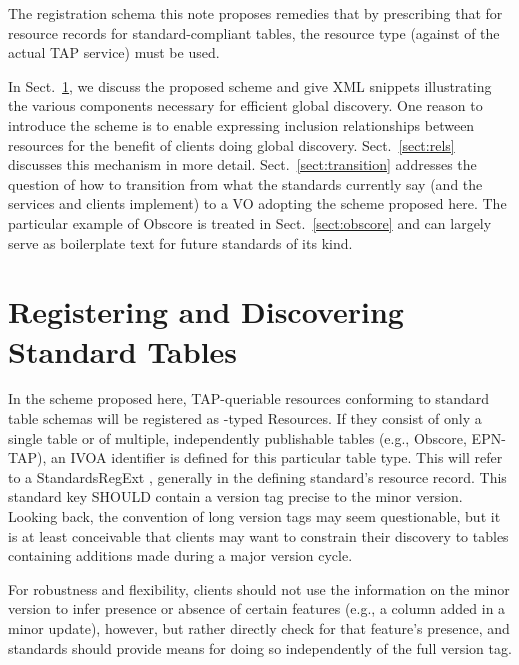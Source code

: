 \documentclass[11pt,a4paper]{ivoa}
\begin{document}
The registration schema this note proposes
remedies that by prescribing that for resource records for
standard-compliant tables, the resource type 
(against  of the actual TAP service) must be used.

In Sect.~\ref{sect:norms}, we discuss the proposed scheme and give
XML snippets illustrating the various components necessary for efficient
global discovery.  One reason to
introduce the scheme is to enable expressing inclusion relationships
between resources for the benefit of clients doing global discovery.
Sect.~\ref{sect:rels} discusses this mechanism in more detail.
Sect.~\ref{sect:transition} addresses the question of how to transition
from what the standards currently say (and the services and clients
implement) to a VO adopting the scheme proposed here.  The particular
example of Obscore is treated in Sect.~\ref{sect:obscore} and can
largely serve as boilerplate text for future standards of its kind.


\section{Registering and Discovering Standard Tables}
\label{sect:norms}

In the scheme proposed here, TAP-queriable resources conforming to
standard table schemas will be registered as
-typed Resources.  If they consist of only a
single table or of multiple, independently publishable tables (e.g.,
Obscore, EPN-TAP), an IVOA identifier \citep{2016ivoa.spec.0523D} is
defined for this particular table type.  This will refer to a StandardsRegExt
\citep{2012ivoa.spec.0508H} , generally in the
defining standard's resource record.  This standard key SHOULD contain a
version tag precise to the minor version.  Looking back, the convention
of long version tags may seem questionable, but it is at least
conceivable that clients may want to constrain their discovery to tables
containing additions made during a major version cycle.

For robustness and flexibility, clients should not use the information
on the minor version to infer presence or absence of certain features
(e.g., a column added in a minor update), however, but rather directly
check for that feature's presence, and standards should provide means
for doing so independently of the full version tag.
\end{document}
